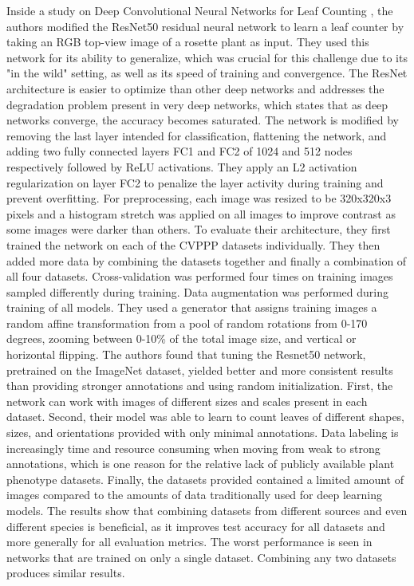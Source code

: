 Inside a study on Deep Convolutional Neural Networks for Leaf Counting \cite{chaudhurystudy}, the authors modified the ResNet50 residual neural network to learn a leaf
counter by taking an RGB top-view image of a rosette plant as input. They used this network for its ability to generalize, which was crucial for this challenge due to its
"in the wild" setting, as well as its speed of training and convergence. The ResNet architecture is easier to optimize than other deep networks and addresses the degradation
problem present in very deep networks, which states that as deep networks converge, the accuracy becomes saturated. The network is modified by removing the last layer
intended for classification, flattening the network, and adding two fully connected layers FC1 and FC2 of 1024 and 512 nodes respectively followed by ReLU activations.
They apply an L2 activation regularization on layer FC2 to penalize the layer activity during training and prevent overfitting. For preprocessing, each image was resized
to be 320x320x3 pixels and a histogram stretch was applied on all images to improve contrast as some images were darker than others. To evaluate their architecture,
they first trained the network on each of the CVPPP datasets individually. They then added more data by combining the datasets together and finally a combination of
all four datasets. Cross-validation was performed four times on training images sampled differently during training. Data augmentation was performed during training
of all models. They used a generator that assigns training images a random affine transformation from a pool of random rotations from 0-170 degrees, zooming
between 0-10\% of the total image size, and vertical or horizontal flipping. The authors found that tuning the Resnet50 network, pretrained on the ImageNet dataset,
yielded better and more consistent results than providing stronger annotations and using random initialization. First, the network can work with images of
different sizes and scales present in each dataset. Second, their model was able to learn to count leaves of different shapes, sizes, and orientations provided
with only minimal annotations.  Data labeling is increasingly time and resource consuming when moving from weak to strong annotations, which is one reason for
the relative lack of publicly available plant phenotype datasets. Finally, the datasets provided contained a limited amount of images compared to the amounts
of data traditionally used for deep learning models. The results show that combining datasets from different sources and even different species is beneficial,
as it improves test accuracy for all datasets and more generally for all evaluation metrics. The worst performance is seen in networks that are trained on only
a single dataset. Combining any two datasets produces similar results.


